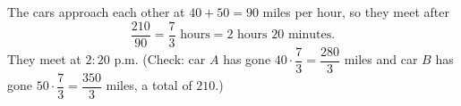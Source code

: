 The cars approach each other at $40+50=90$ miles per hour, so they meet after
\[
\dfrac{210}{90}=\dfrac{7}{3}\text{ hours}=2\text{ hours }20\text{ minutes}.
\]
They meet at $\boxed{2{:}20\text{ p.m.}}$ (Check: car $A$ has gone $40\cdot\dfrac{7}{3}=\dfrac{280}{3}$ miles and car $B$ has gone $50\cdot\dfrac{7}{3}=\dfrac{350}{3}$ miles, a total of $210$.)

